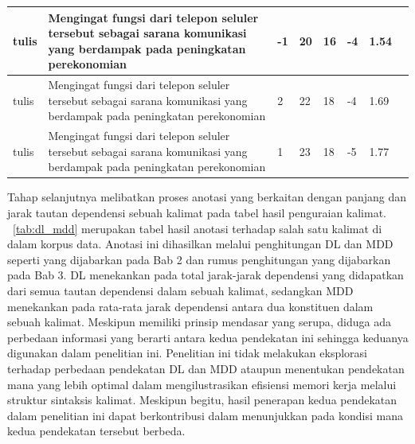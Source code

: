 \begin{center}
\begin{table}
\begin{tiny}
\begin{tabulary}{1\textwidth}{| L | L | L | L | L | L | L | L |}
tulis & Mengingat fungsi dari telepon seluler tersebut sebagai sarana komunikasi yang berdampak pada peningkatan perekonomian & -1 & 20 & 16 & -4 & 1.54 \\ \hline
tulis & Mengingat fungsi dari telepon seluler tersebut sebagai sarana komunikasi yang berdampak pada peningkatan perekonomian & 2 & 22 & 18 & -4 & 1.69 \\ \hline
tulis & Mengingat fungsi dari telepon seluler tersebut sebagai sarana komunikasi yang berdampak pada peningkatan perekonomian & 1 & 23 & 18 & -5 & 1.77 \\ \hline
  \end{tabulary}  
\end{tiny}
\end{table}
\end{center}

Tahap selanjutnya melibatkan proses anotasi yang berkaitan dengan panjang dan jarak tautan dependensi sebuah kalimat pada tabel hasil penguraian kalimat. \tab~\ref{tab:dl_mdd} merupakan tabel hasil anotasi terhadap salah satu kalimat di dalam korpus data. Anotasi ini dihasilkan melalui penghitungan DL dan MDD seperti yang dijabarkan pada Bab 2 dan rumus penghitungan yang dijabarkan pada Bab 3. DL menekankan pada total jarak-jarak dependensi yang didapatkan dari semua tautan dependensi dalam sebuah kalimat, sedangkan MDD menekankan pada rata-rata jarak dependensi antara dua konstituen dalam sebuah kalimat. Meskipun memiliki prinsip mendasar yang serupa, diduga ada perbedaan informasi yang berarti antara kedua pendekatan ini sehingga keduanya digunakan dalam penelitian ini. Penelitian ini tidak melakukan eksplorasi terhadap perbedaan pendekatan DL dan MDD ataupun menentukan pendekatan mana yang lebih optimal dalam mengilustrasikan efisiensi memori kerja melalui struktur sintaksis kalimat. Meskipun begitu, hasil penerapan kedua pendekatan dalam penelitian ini dapat berkontribusi dalam menunjukkan pada kondisi mana kedua pendekatan tersebut berbeda.

